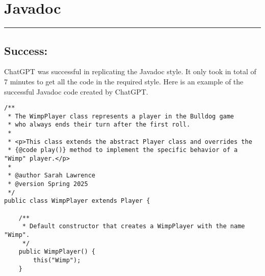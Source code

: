 \documentclass[a4paper,11pt]{article}
\begin{document}
\section*{Javadoc}
\hrule
\vspace{13pt} %
\subsection*{Success:}
ChatGPT was successful in replicating the Javadoc style. It only took in total of 7 minutes to get all the code in the required style. Here is an example of the successful Javadoc code created by ChatGPT. 
\begin{lstlisting}
/**
 * The WimpPlayer class represents a player in the Bulldog game 
 * who always ends their turn after the first roll.
 * 
 * <p>This class extends the abstract Player class and overrides the 
 * {@code play()} method to implement the specific behavior of a "Wimp" player.</p>
 * 
 * @author Sarah Lawrence
 * @version Spring 2025
 */
public class WimpPlayer extends Player {

    /**
     * Default constructor that creates a WimpPlayer with the name "Wimp".
     */
    public WimpPlayer() {
        this("Wimp");
    }
\end{lstlisting}
\end{document}
